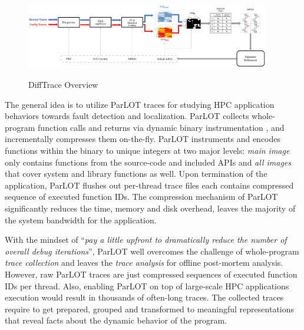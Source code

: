 \begin{figure}[]
\caption{DiffTrace Overview}
\includegraphics[width=0.95\textwidth]{figs/overview.png}
\label{fig.diffTraceOverview}
\end{figure}

The general idea is to utilize ParLOT \cite{ parlot} traces for studying HPC application behaviors towards fault detection and localization.
%
ParLOT collects whole-program function calls and returns via dynamic binary instrumentation \cite{pin}, and incrementally compresses them on-the-fly.
%
ParLOT instruments and encodes functions within the binary to unique integers at two major levels: \textit{main image} only contains functions from the source-code and included APIs and \textit{all images} that cover system and library functions as well.
%
Upon termination of the application, ParLOT flushes out per-thread trace files each contains compressed sequence of executed function IDs.
%
The compression mechanism of ParLOT significantly reduces the time, memory and disk overhead, leaves the majority of the system bandwidth for the application. 
%

With the mindset of ``\textit{pay a little upfront to dramatically reduce the number of overall debug iterations}'', ParLOT well overcomes the challenge of whole-program \textit{trace collection} and leaves the \textit{trace analysis} for offline post-mortem analysis. 
%
However, raw ParLOT traces are just compressed sequences of executed function IDs per thread.
%
Also, enabling ParLOT on top of large-scale HPC applications execution would result in thousands of often-long traces.
%
The collected traces require to  get prepared, grouped and transformed to meaningful representations that reveal facts about the dynamic behavior of the program.


